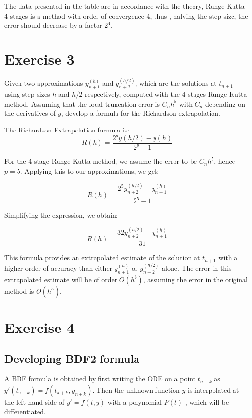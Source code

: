 \documentclass[a4paper,12pt]{article}
\begin{document}
The data presented in the table are in accordance with the theory,
Runge-Kutta 4 stages is a method with order of convergence 4, thus , halving the step size, the error should decrease by a factor $2^4$. 

\section{Exercise 3}

Given two approximations $y_{n+1}^{(h)}$ and $y_{n+2}^{(h/2)}$, which are the solutions at $t_{n+1}$ using step sizes $h$ and $h/2$ respectively, computed with the 4-stages Runge-Kutta method. Assuming that the local truncation error is $C_nh^5$ with $C_n$ depending on the derivatives of $y$, develop a formula for the Richardson extrapolation.

The Richardson Extrapolation formula is:
\begin{equation}
    R(h) = \frac{2^p y(h/2) - y(h)}{2^p - 1}
\end{equation}

For the 4-stage Runge-Kutta method, we assume the error to be $C_nh^5$, hence $p = 5$. Applying this to our approximations, we get:

\begin{equation}
    R(h) = \frac{2^5 y_{n+2}^{(h/2)} - y_{n+1}^{(h)}}{2^5 - 1}
\end{equation}

Simplifying the expression, we obtain:

\begin{equation}
    R(h) = \frac{32 y_{n+2}^{(h/2)} - y_{n+1}^{(h)}}{31}
\end{equation}

This formula provides an extrapolated estimate of the solution at $t_{n+1}$ with a higher order of accuracy than either $y_{n+1}^{(h)}$ or $y_{n+2}^{(h/2)}$ alone.
The error in this extrapolated estimate will be of order $O(h^6)$, assuming the error in the original method is $O(h^5)$.




\section{Exercise 4}
\subsection*{Developing BDF2 formula}
A BDF formula is obtained by first writing the ODE on a point \(t_{n+k}\) as \(y'(t_{n+k}) = f(t_{n+k}, y_{n+k})\). Then the unknown function \(y\) is interpolated at the left hand side of \(y' = f(t, y)\) with a polynomial \(P(t)\) , which will be differentiated.
\end{document}
